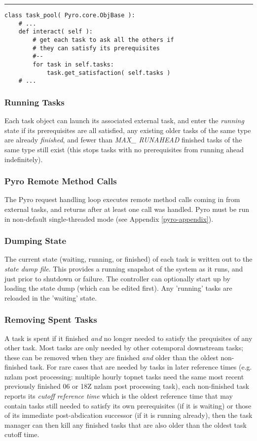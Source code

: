 \documentclass[11pt,a4paper]{article}
\begin{document}
{\small
\noindent
\rule{5cm}{.2mm}
\begin{lstlisting}
class task_pool( Pyro.core.ObjBase ):
    # ...
    def interact( self ):
        # get each task to ask all the others if 
        # they can satisfy its prerequisites
        #--
        for task in self.tasks:
            task.get_satisfaction( self.tasks )
    # ...
\end{lstlisting}
}

\subsubsection{Running Tasks}

Each task object can launch its associated external task, and enter the
{\em running} state if its prerequisites are all satisfied, any existing
older tasks of the same type are already {\em finished}, and fewer than
{\em MAX\_ RUNAHEAD} finished tasks of the same type still exist (this
stops tasks with no prerequisites from running ahead indefinitely).

\subsubsection{Pyro Remote Method Calls}

The Pyro request handling loop executes remote method calls coming in
from external tasks, and returns after at least one call was handled.
Pyro must be run in non-default single-threaded mode (see Appendix
\ref{pyro-appendix}).

\subsubsection{Dumping State} 

The current state (waiting, running, or finished) of each task is
written out to the {\em state dump file}.  This provides a running
snapshot of the system as it runs, and just prior to shutdown or
failure. The controller can optionally start up by loading the state
dump (which can be edited first). Any 'running' tasks are reloaded in
the 'waiting' state.

\subsubsection{Removing Spent Tasks} 

A task is spent if it finished {\em and} no longer needed to satisfy the
prequisites of any other task. Most tasks are only needed by other
cotemporal downstream tasks; these can be removed when they are finished
{\em and} older than the oldest non-finished task. For rare cases that
are needed by tasks in later reference times (e.g. nzlam post
processing: multiple hourly topnet tasks need the same most recent
previously finished 06 or 18Z nzlam post processing task), each
non-finished task reports its {\em cutoff reference time} which is the
oldest reference time that may contain tasks still needed to satisfy its
own prerequisites (if it is waiting) or those of its immediate
post-abdication successor (if it is running already), then the task
manager can then kill any finished tasks that are also older than the
oldest task cutoff time.
\end{document}
